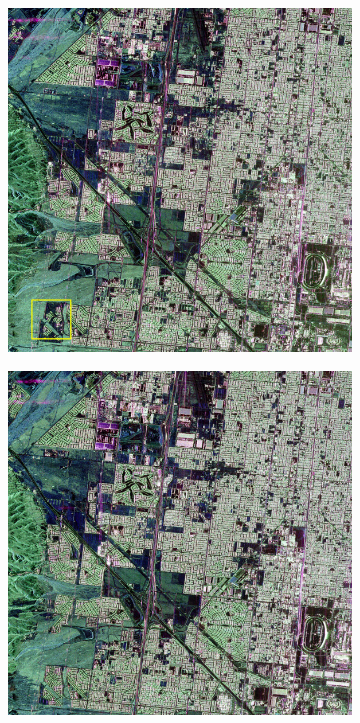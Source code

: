 \begin{figure}[tbp]
\centering
\begin{subfigure}[b]{0.32\textwidth}
		\includegraphics[width=\textwidth]{Figures/CD/2009}
		\caption{}
		\label{fig:2_a}
\end{subfigure}
\hspace{0.05pt}
\begin{subfigure}[b]{0.32\textwidth}
		\includegraphics[width=\textwidth]{Figures/CD/2015.jpg}

\end{subfigure}
\end{figure}

